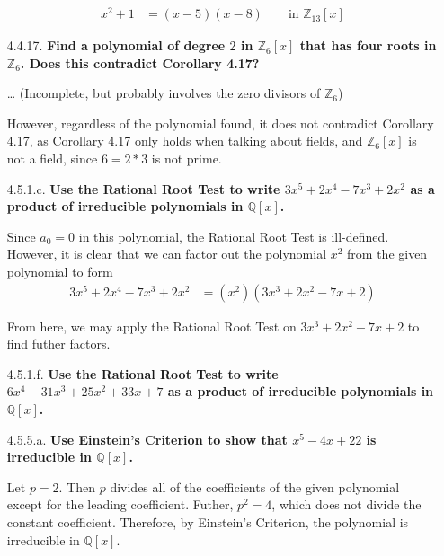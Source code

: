\documentclass{article}
\begin{document}
\begin{enumerate}
			\begin{align*}
				x^2 + 1 & = (x - 5)(x - 8) \qquad \text{in }\mathbb{Z}_{13}[x]
			\end{align*}

		\item [4.4.17.] \textbf{Find a polynomial of degree $2$ in $\mathbb{Z}_6[x]$ that has four
								roots in $\mathbb{Z}_6$. Does this contradict Corollary 4.17?}

			\dots
			(Incomplete, but probably involves the zero divisors of $\mathbb{Z}_6$)

			However, regardless of the polynomial found, it does not contradict Corollary 4.17, as 
			Corollary 4.17 only holds when talking about fields, and $\mathbb{Z}_6[x]$ is not a 
			field, since $6 = 2 * 3$ is not prime.			

		\item [4.5.1.c.] \textbf{Use the Rational Root Test to write $3x^5 + 2x^4 - 7x^3 + 2x^2$ as
								 a product of irreducible polynomials in $\mathbb{Q}[x]$.}

			Since $a_0 = 0$ in this polynomial, the Rational Root Test is ill-defined. However, it
			is clear that we can factor out the polynomial $x^2$ from the given polynomial to form
			\begin{align*}
				3x^5 + 2x^4 - 7x^3 + 2x^2 & = (x^2)(3x^3 + 2x^2 - 7x + 2)
			\end{align*}

			From here, we may apply the Rational Root Test on $3x^3 + 2x^2 - 7x + 2$ to find futher
			factors.

		\item [4.5.1.f.] \textbf{Use the Rational Root Test to write $6x^4 - 31x^3 + 25x^2 + 33x 
								 + 7$ as a product of irreducible polynomials in $\mathbb{Q}[x]$.}




		\item [4.5.5.a.] \textbf{Use Einstein's Criterion to show that $x^5 - 4x + 22$ is 
								 irreducible in $\mathbb{Q}[x]$.}

			Let $p = 2$. Then $p$ divides all of the coefficients of the given polynomial except for
			the leading coefficient. Futher, $p^2 = 4$, which does not divide the constant 
			coefficient. Therefore, by Einstein's Criterion, the polynomial is irreducible in 
			$\mathbb{Q}[x]$.


\end{enumerate}
\end{document}
